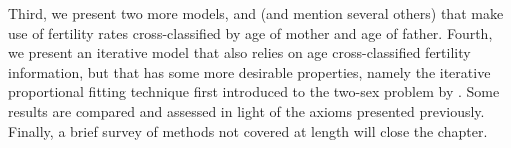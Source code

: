 Third, we present two more models, \citet{gupta1978alternative} and
\citet{schoen1981harmonic} (and mention several others) that make use of
fertility rates cross-classified by age of mother and age of father. Fourth, 
we present an iterative model that also relies on age
cross-classified fertility information, but that has some more desirable
properties, namely the iterative proportional fitting technique first
introduced to the two-sex problem by \citet{mc1975models}. Some results are
 compared and assessed in light of the axioms presented previously. Finally, a
 brief survey of methods not covered at length will close the chapter.
 
\FloatBarrier